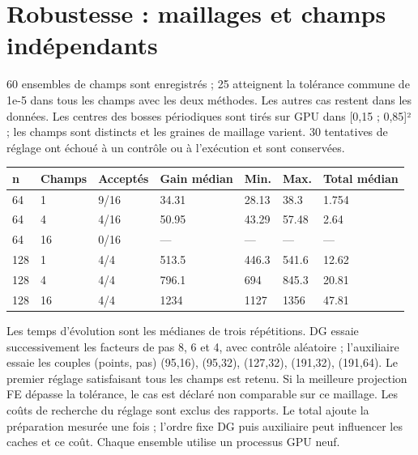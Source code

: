 \documentclass[10pt,a4paper]{article}
\begin{document}
\section{Robustesse : maillages et champs indépendants}
60 ensembles de champs sont enregistrés ; 25 atteignent la tolérance commune de 1e-5 dans tous les champs avec les deux méthodes. Les autres cas restent dans les données. Les centres des bosses périodiques sont tirés sur GPU dans [0,15 ; 0,85]² ; les champs sont distincts et les graines de maillage varient. 30 tentatives de réglage ont échoué à un contrôle ou à l'exécution et sont conservées.

\begin{center}\small\begin{tabular}{lllllll}\toprule
n & Champs & Acceptés & Gain médian & Min. & Max. & Total médian\\\midrule
64 & 1 & 9/16 & 34.31 & 28.13 & 38.3 & 1.754\\
64 & 4 & 4/16 & 50.95 & 43.29 & 57.48 & 2.64\\
64 & 16 & 0/16 & — & — & — & —\\
128 & 1 & 4/4 & 513.5 & 446.3 & 541.6 & 12.62\\
128 & 4 & 4/4 & 796.1 & 694 & 845.3 & 20.81\\
128 & 16 & 4/4 & 1234 & 1127 & 1356 & 47.81\\
\bottomrule\end{tabular}\end{center}
Les temps d'évolution sont les médianes de trois répétitions. DG essaie successivement les facteurs de pas 8, 6 et 4, avec contrôle aléatoire ; l'auxiliaire essaie les couples (points, pas) (95,16), (95,32), (127,32), (191,32), (191,64). Le premier réglage satisfaisant tous les champs est retenu. Si la meilleure projection FE dépasse la tolérance, le cas est déclaré non comparable sur ce maillage. Les coûts de recherche du réglage sont exclus des rapports. Le total ajoute la préparation mesurée une fois ; l'ordre fixe DG puis auxiliaire peut influencer les caches et ce coût. Chaque ensemble utilise un processus GPU neuf.
\end{document}
